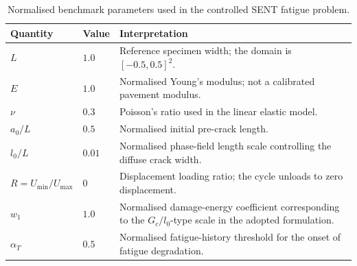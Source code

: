 \begingroup
\begin{longtable}{p{} p{} p{}}
\caption{Normalised benchmark parameters used in the controlled SENT fatigue problem.}
\label{tab:c3_benchmark_parameters}\\
\hline
\textbf{Quantity} & \textbf{Value} & \textbf{Interpretation} \\
\hline
\(L\) & \(1.0\) & Reference specimen width; the domain is \([-0.5,0.5]^2\). \\
\(E\) & \(1.0\) & Normalised Young's modulus; not a calibrated pavement modulus. \\
\(\nu\) & \(0.3\) & Poisson's ratio used in the linear elastic model. \\
\(a_0/L\) & \(0.5\) & Normalised initial pre-crack length. \\
\(l_0/L\) & \(0.01\) & Normalised phase-field length scale controlling the diffuse crack width. \\
\(R=U_{\min}/U_{\max}\) & \(0\) & Displacement loading ratio; the cycle unloads to zero displacement. \\
\(w_1\) & \(1.0\) & Normalised damage-energy coefficient corresponding to the \(G_c/l_0\)-type scale in the adopted formulation. \\
\(\alpha_T\) & \(0.5\) & Normalised fatigue-history threshold for the onset of fatigue degradation. \\
\hline
\end{longtable}
\endgroup






